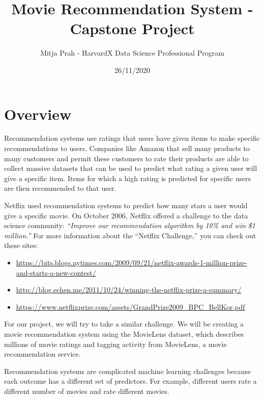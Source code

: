 \documentclass[
]{article}
\title{Movie Recommendation System - Capstone Project}
\author{Mitja Prah - HarvardX Data Science Professional Program}
\date{26/11/2020}
\providecommand{\tightlist}{%
  \setlength{\itemsep}{0pt}\setlength{\parskip}{0pt}}
\begin{document}
\maketitle

{
\hypersetup{linkcolor=}
\setcounter{tocdepth}{3}
\tableofcontents
}
\newpage

\hypertarget{overview}{%
\section{Overview}\label{overview}}

Recommendation systems use ratings that users have given items to make
specific recommendations to users. Companies like Amazon that sell many
products to many customers and permit these customers to rate their
products are able to collect massive datasets that can be used to
predict what rating a given user will give a specific item. Items for
which a high rating is predicted for specific users are then recommended
to that user.

Netflix used recommendation systems to predict how many stars a user
would give a specific movie. On October 2006, Netflix offered a
challenge to the data science community: \emph{``Improve our
recommendation algorithm by 10\% and win \$1 million.''} For more
information about the ``Netflix Challenge,'' you can check out these
sites:

\begin{itemize}
\tightlist
\item
  \url{https://bits.blogs.nytimes.com/2009/09/21/netflix-awards-1-million-prize-and-starts-a-new-contest/}~\\
\item
  \url{http://blog.echen.me/2011/10/24/winning-the-netflix-prize-a-summary/}~\\
\item
  \url{https://www.netflixprize.com/assets/GrandPrize2009_BPC_BellKor.pdf}
\end{itemize}

For our project, we will try to take a similar challenge. We will be
creating a movie recommendation system using the MovieLens dataset,
which describes millions of movie ratings and tagging activity from
MovieLens, a movie recommendation service.

Recommendation systems are complicated machine learning challenges
because each outcome has a different set of predictors. For example,
different users rate a different number of movies and rate different
movies.
\end{document}
